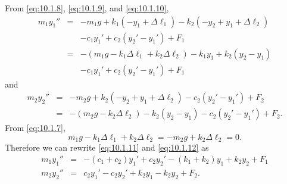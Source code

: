 \documentclass{ximera}
\begin{document}
\begin{example}
\begin{explanation}
From \eqref{eq:10.1.8}, \eqref{eq:10.1.9}, and \eqref{eq:10.1.10},
\begin{equation} \label{eq:10.1.11}
\begin{array}{ccl}
m_1y_1''&=&-m_1g+k_1(-y_1+\Delta\ell_1)-k_2(-y_2+y_1+\Delta\ell_2)\\
  & &-c_1y_1'+c_2(y_2'-y_1')+F_1\\
&=&-(m_1g-k_1\Delta\ell_1+k_2\Delta\ell_2)-k_1y_1+k_2(y_2-y_1)\\
& &-c_1y_1'+c_2(y_2'-y_1')+F_1
\end{array}
\end{equation}
and
\begin{equation} \label{eq:10.1.12}
\begin{array}{ccl}
m_2y_2''&=&-m_2g+k_2(-y_2+y_1+\Delta\ell_2)-c_2(y_2'-y_1')+F_2\\
&=&-(m_2g-k_2\Delta\ell_2)-k_2(y_2-y_1)-c_2(y_2'-y_1')+F_2.
\end{array}
\end{equation}
From \eqref{eq:10.1.7},
$$
m_1g-k_1\Delta\ell_1+k_2\Delta\ell_2=-m_2g+k_2\Delta\ell_2=0.
$$
Therefore we can rewrite \eqref{eq:10.1.11} and \eqref{eq:10.1.12}
as
\begin{eqnarray*}
m_1y_1''&=&-(c_1+c_2)y_1'+c_2y_2'-(k_1+k_2)y_1+k_2y_2+F_1\\
m_2y_2''&=&c_2y_1'-c_2y_2'+k_2y_1-k_2y_2+F_2.
\end{eqnarray*}
\end{explanation}
\end{example}
\end{document}

